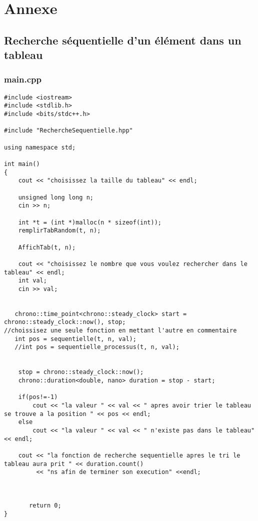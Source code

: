 \chapter{Annexe}

\section{Recherche séquentielle d'un élément dans un tableau}

\subsection{main.cpp}
\begin{verbatim}
#include <iostream>
#include <stdlib.h>
#include <bits/stdc++.h>

#include "RechercheSequentielle.hpp"

using namespace std;

int main()
{
    cout << "choisissez la taille du tableau" << endl;

    unsigned long long n;
    cin >> n;

    int *t = (int *)malloc(n * sizeof(int));
    remplirTabRandom(t, n);

    AffichTab(t, n);

    cout << "choisissez le nombre que vous voulez rechercher dans le tableau" << endl;
    int val;
    cin >> val;


   chrono::time_point<chrono::steady_clock> start = chrono::steady_clock::now(), stop;
//choissisez une seule fonction en mettant l'autre en commentaire
   int pos = sequentielle(t, n, val);
   //int pos = sequentielle_processus(t, n, val);


    stop = chrono::steady_clock::now();
    chrono::duration<double, nano> duration = stop - start;

    if(pos!=-1)
        cout << "la valeur " << val << " apres avoir trier le tableau se trouve a la position " << pos << endl;
    else
        cout << "la valeur " << val << " n'existe pas dans le tableau" << endl;

    cout << "la fonction de recherche sequentielle apres le tri le tableau aura prit " << duration.count()
         << "ns afin de terminer son execution" <<endl;



       return 0;
}
\end{verbatim}

